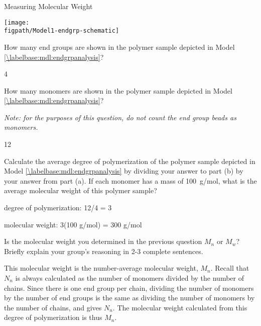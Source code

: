 \begin{activity}{Measuring Molecular Weight}
\begin{model}
	\centerline{\texttt{[image: \\figpath/Model1-endgrp-schematic]}}

\end{model}


\begin{ctqs}

	\question How many end groups are shown in the polymer sample depicted in Model \ref{\labelbase:mdl:endgrpanalysis}?
	
		\begin{solution}[0.25in]
			4
		\end{solution}
	
	\question How many monomers are shown in the polymer sample depicted in Model \ref{\labelbase:mdl:endgrpanalysis}?
	
		\emph{Note: for the purposes of this question, do not count the end group beads as monomers.}
	
		\begin{solution}[0.25in]
			12
		\end{solution}
	
	\question Calculate the average degree of polymerization of the polymer sample depicted in Model \ref{\labelbase:mdl:endgrpanalysis} by dividing your answer to part (b) by your answer from part (a).  If each monomer has a mass of 100~g/mol, what is the average molecular weight of this polymer sample?
	
		\begin{solution}[0.5in]
			degree of polymerization: 12/4 = 3
			
			molecular weight: 3(100 g/mol) = 300 g/mol
		\end{solution}
	
	\question Is the molecular weight you determined in the previous question $M_n$ or $M_w$?  Briefly explain your group's reasoning in 2-3 complete sentences.
	
		\begin{solution}[1.5in]
			This molecular weight is the number-average molecular weight, $M_n$.  Recall that $N_n$ is always calculated as the number of monomers divided by the number of chains.  Since there is one end group per chain, dividing the number of monomers by the number of end groups is the same as dividing the number of monomers by the number of chains, and gives $N_n$.  The molecular weight calculated from this degree of polymerization is thus $M_n$.
		\end{solution}
	
\end{ctqs}


\end{activity}
